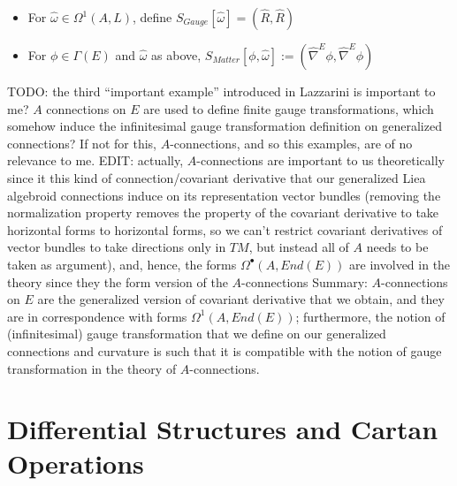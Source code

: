 {\begin{itemize}
        \begin{itemize}
            
        \item For $\hat \omega \in \Omega^1(A, L)$, define $S_{Gauge}[\hat \omega] = (\hat R, \hat R)$
        
        \item For $\phi \in \Gamma(E)$ and $\hat \omega$ as above, $S_{Matter}[\phi, \hat \omega] := (\hat \nabla^E \phi, \hat \nabla^E \phi)$
        
        \end{itemize}
        
    \end{itemize}

TODO: the third ``important example'' introduced in Lazzarini is important to me? $A$ connections on $E$ are used to define finite gauge transformations, which somehow induce the infinitesimal gauge transformation definition on generalized connections? If not for this, $A$-connections, and so this examples, are of no relevance to me. EDIT: actually, $A$-connections are important to us theoretically  since it this kind of connection/covariant derivative that our generalized Liea algebroid connections induce on its representation vector bundles (removing the normalization property removes the property of the covariant derivative to take horizontal forms to horizontal forms, so we can't restrict covariant derivatives of vector bundles to take directions only in $TM$, but instead all of $A$ needs to be taken as argument), and, hence, the forms $\Omega^\bullet(A, End(E))$ are involved in the theory since they the form version of the $A$-connections Summary: $A$-connections on $E$ are the generalized version of covariant derivative that we obtain, and they are in correspondence with forms $\Omega^1(A, End(E))$; furthermore, the notion of (infinitesimal) gauge transformation that we define on our generalized connections and curvature is such that it is compatible with the notion of gauge transformation in the theory of $A$-connections.
}

\section{Differential Structures and Cartan Operations}

